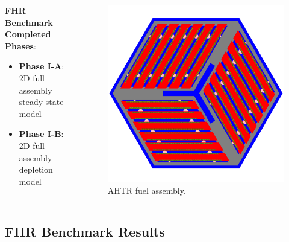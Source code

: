 \begin{frame}
\begin{columns}[t]
\begin{column}{0.5\textwidth}
        \vspace{0.1cm}
        \textbf{FHR Benchmark Completed Phases}: 
        \begin{itemize}
            \item \textbf{Phase I-A}: 2D full assembly steady state model 
            \item \textbf{Phase I-B}: 2D full assembly depletion model 
        \end{itemize}
    \end{column}
    \begin{column}{0.5\textwidth}
        \begin{figure}[]
            \includegraphics[width=\linewidth]{../docs/figures/ahtr-fuel-element.png} 
            \vspace{-0.3cm}
            \caption{AHTR fuel assembly.}
        \end{figure}
    \end{column}
\end{columns}
\end{frame}

\subsection{FHR Benchmark Results}

